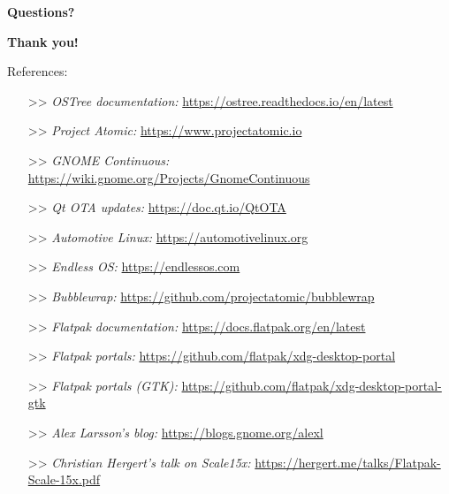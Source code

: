 %
%
%
\begin{frame}
  \begin{center}
  \Huge
  \textbf{Questions?}
  \end{center}
\end{frame}

\begin{frame}
  \begin{center}
  \Huge
  \textbf{Thank you!}
  \end{center}
\end{frame}

\begin{frame}
  References:\vspacing
  \begin{tiny}
    \begin{itemize}
    \item[>>] \textit{OSTree documentation:} \url{https://ostree.readthedocs.io/en/latest}\vspacing
    \item[>>] \textit{Project Atomic:} \url{https://www.projectatomic.io}\vspacing
    \item[>>] \textit{GNOME Continuous:} \url{https://wiki.gnome.org/Projects/GnomeContinuous}\vspacing
    \item[>>] \textit{Qt OTA updates:} \url{https://doc.qt.io/QtOTA}\vspacing
    \item[>>] \textit{Automotive Linux:} \url{https://automotivelinux.org}\vspacing
    \item[>>] \textit{Endless OS:} \url{https://endlessos.com}\vspacing
    \item[>>] \textit{Bubblewrap:} \url{https://github.com/projectatomic/bubblewrap}\vspacing
    \item[>>] \textit{Flatpak documentation:} \url{https://docs.flatpak.org/en/latest}\vspacing
    \item[>>] \textit{Flatpak portals:} \url{https://github.com/flatpak/xdg-desktop-portal}\vspacing
    \item[>>] \textit{Flatpak portals (GTK):} \url{https://github.com/flatpak/xdg-desktop-portal-gtk}\vspacing
    \item[>>] \textit{Alex Larsson's blog:} \url{https://blogs.gnome.org/alexl}\vspacing
    \item[>>] \textit{Christian Hergert's talk on Scale15x:} \url{https://hergert.me/talks/Flatpak-Scale-15x.pdf}
    \end{itemize}
  \end{tiny}
\end{frame}
